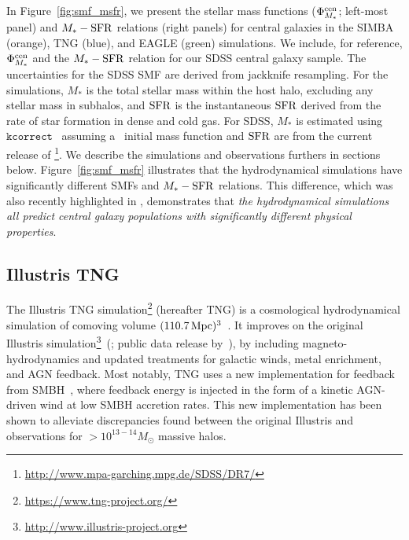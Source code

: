 In Figure~\ref{fig:smf_msfr}, we present the stellar mass functions ($\Phi^{\rm
cen}_{M_*}$; left-most panel) and $M_*-{\rm SFR}$ relations (right panels) for
central galaxies in the SIMBA (orange), TNG (blue), and EAGLE (green) simulations. 
We include, for reference, $\Phi^{\rm cen}_{M_*}$ and the $M_*-{\rm SFR}$ relation for
our SDSS central galaxy sample. The uncertainties for the SDSS SMF are derived 
from jackknife resampling. For the simulations, $M_*$ is the total stellar mass 
within the host halo, excluding any stellar mass in subhalos, and ${\rm SFR}$ is the
instantaneous ${\rm SFR}$ derived from the rate of star formation in dense and cold gas. 
For SDSS, $M_*$ is estimated using $\mathtt{kcorrect}$~\citep{blanton2007a} 
assuming a~\cite{chabrier2003} initial mass function and ${\rm SFR}$ are from the
current release of
\cite{brinchmann2004}\footnote{\url{http://www.mpa-garching.mpg.de/SDSS/DR7/}}.
We describe the simulations and observations furthers in sections below. 
Figure~\ref{fig:smf_msfr} illustrates that the hydrodynamical simulations have 
significantly different SMFs and $M_*-{\rm SFR}$ relations. 
This difference, which was also recently highlighted in \cite{hahn2019c}, 
demonstrates that \emph{the hydrodynamical simulations all predict central 
galaxy populations with significantly different physical properties}.

\subsection{Illustris TNG} \label{sec:tng}
The Illustris TNG simulation\footnote{\url{https://www.tng-project.org/}}
(hereafter TNG) is a cosmological hydrodynamical simulation of comoving 
volume $(110.7\,{\rm Mpc})^3$~\citep{nelson2018, pillepich2018, springel2018}. It
improves on the original Illustris
simulation\footnote{\url{http://www.illustris-project.org}}~(\citealt{vogelsberger2014, genel2014};
public data release by~\citealt{nelson2015}), by including
magneto-hydrodynamics and updated treatments for galactic winds, metal
enrichment, and AGN feedback. Most notably, TNG uses a new implementation for
feedback from SMBH~\citep{weinberger2018}, where feedback energy is injected in
the form of a kinetic AGN-driven wind at low SMBH accretion rates. This new
implementation has been shown to alleviate discrepancies found between the
original Illustris and observations for $> 10^{13-14} M_\odot$ massive halos. 

